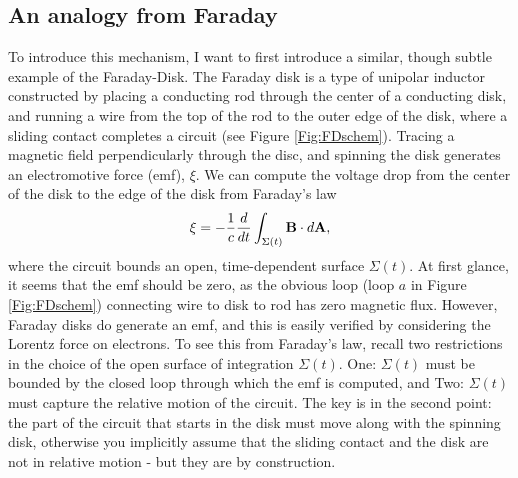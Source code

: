 \subsection{An analogy from Faraday}
To introduce this mechanism, I want to first introduce a similar, though
subtle example of the Faraday-Disk. The Faraday disk is a type of unipolar
inductor constructed by placing a conducting rod through the center of a
conducting disk, and running a wire from the top of the rod to the outer edge
of the disk, where a sliding contact completes a circuit (see Figure
\ref{Fig:FDschem}). Tracing a magnetic field perpendicularly through the disc,
and spinning the disk generates an electromotive force (emf), $\xi$. We can compute
the voltage drop from the center of the disk to the edge of the disk from
Faraday's law
\begin{align} 
\xi = - \frac{1}{c}\frac{d}{dt}\int_{\Sigma(t)}{{\bf B} \cdot d{\bf A}}, 
\end{align} 
where the circuit bounds an open, time-dependent surface $\Sigma(t)$. At first
glance, it seems that the emf should be zero, as the obvious loop (loop $a$ in
Figure \ref{Fig:FDschem}) connecting wire to disk to rod has zero magnetic
flux. However, Faraday disks do generate an emf, and this is easily verified
by considering the Lorentz force on electrons. To see this from Faraday's law, recall two restrictions in the
choice of the open surface of integration $\Sigma(t)$. One: $\Sigma(t)$ must be bounded by the closed loop through which the emf is computed, and Two: $\Sigma(t)$ must capture the relative motion of the circuit.
The key is in the second point: the part of the circuit that starts in the
disk must move along with the spinning disk, otherwise you implicitly assume
that the sliding contact and the disk are not in relative motion - but they
are by construction.


